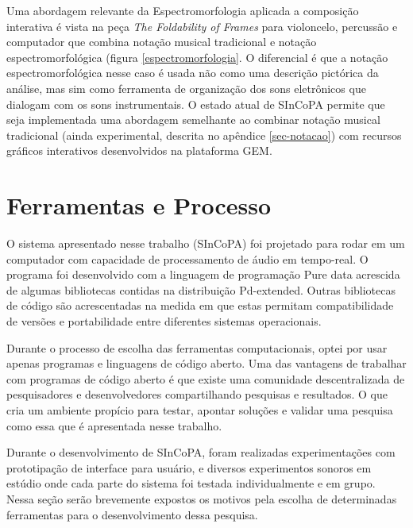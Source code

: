 \documentclass{ppgmus}
\begin{document}
Uma abordagem relevante da Espectromorfologia aplicada a composição interativa é vista na peça
\textit{The Foldability of Frames} \cite{Patton:2007} para violoncelo, percussão e 
computador que combina notação musical tradicional e notação espectromorfológica
(figura \ref{espectromorfologia}.
O diferencial é que a notação espectromorfológica nesse caso é usada não como uma descrição pictórica
da análise, mas sim como ferramenta de organização dos sons eletrônicos que dialogam
com os sons instrumentais. O estado atual de SInCoPA permite que seja implementada uma
abordagem semelhante ao combinar notação musical tradicional (ainda experimental,
descrita no apêndice \ref{sec-notacao}) com recursos gráficos interativos desenvolvidos 
na plataforma GEM.



\chapter{Ferramentas e Processo}
\label{sec:metodologia}



O sistema apresentado nesse trabalho (SInCoPA) foi projetado para rodar em um computador com capacidade de processamento
de áudio em tempo-real. O programa foi desenvolvido com
a linguagem de programação Pure data acrescida de algumas bibliotecas contidas
na distribuição Pd-extended. Outras bibliotecas de código são
acrescentadas na medida em que estas permitam compatibilidade de
versões e portabilidade entre diferentes sistemas operacionais.

Durante o processo de escolha das ferramentas computacionais, optei
por usar apenas programas e linguagens de código aberto.
Uma das vantagens de trabalhar com programas de código aberto é que existe uma
comunidade descentralizada de pesquisadores e desenvolvedores compartilhando
pesquisas e resultados. O que cria um ambiente propício para testar, apontar soluções e validar 
uma pesquisa como essa que é apresentada nesse trabalho.

Durante o desenvolvimento de SInCoPA, foram realizadas experimentações com prototipação de interface para usuário,
e diversos experimentos sonoros em estúdio onde cada parte do sistema foi
testada individualmente e em grupo.
Nessa seção serão brevemente expostos os motivos pela escolha de determinadas ferramentas para
o desenvolvimento dessa pesquisa.
\end{document}
